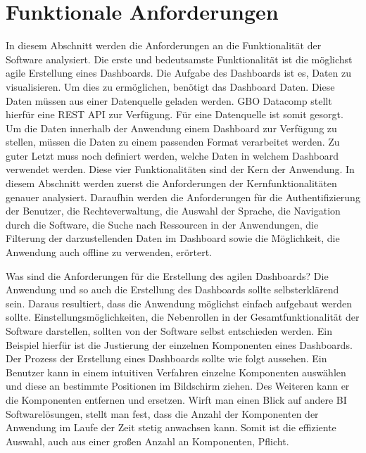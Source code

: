 \section{Funktionale Anforderungen}
\label{sec:funktionaleanforderungen}
In diesem Abschnitt werden die Anforderungen an die Funktionalität der Software analysiert.
Die erste und bedeutsamste Funktionalität ist
die möglichst agile Erstellung eines Dashboards. Die Aufgabe des Dashboards ist es, Daten
zu visualisieren. Um dies zu ermöglichen, benötigt das Dashboard Daten. Diese Daten
müssen aus einer Datenquelle geladen werden. GBO Datacomp stellt hierfür eine REST API
zur Verfügung. Für eine Datenquelle ist somit gesorgt. Um die Daten innerhalb der Anwendung
einem Dashboard zur Verfügung zu stellen, müssen die Daten zu einem passenden Format verarbeitet werden.
Zu guter Letzt muss noch definiert werden, welche Daten in welchem Dashboard verwendet
werden. Diese vier Funktionalitäten sind der Kern der Anwendung. In diesem Abschnitt
werden zuerst die Anforderungen der Kernfunktionalitäten genauer analysiert. Daraufhin werden die Anforderungen
für die Authentifizierung der Benutzer, die Rechteverwaltung, die Auswahl der Sprache,
die Navigation durch die Software, die Suche nach Ressourcen in der Anwendungen,
die Filterung der darzustellenden Daten im Dashboard sowie die Möglichkeit,
die Anwendung auch offline zu verwenden, erörtert.

Was sind die Anforderungen für die Erstellung des agilen Dashboards? Die Anwendung und
so auch die Erstellung des Dashboards sollte selbsterklärend sein. Daraus resultiert, 
dass die Anwendung möglichst einfach aufgebaut werden sollte. Einstellungsmöglichkeiten,
die Nebenrollen in der Gesamtfunktionalität der Software darstellen, sollten von der
Software selbst entschieden werden. Ein Beispiel hierfür ist die Justierung der
einzelnen Komponenten eines Dashboards. Der Prozess der Erstellung eines Dashboards
sollte wie folgt aussehen. Ein Benutzer kann in einem intuitiven Verfahren
einzelne Komponenten auswählen und diese an bestimmte Positionen im Bildschirm
ziehen. Des Weiteren kann er die Komponenten
entfernen und ersetzen. Wirft man einen Blick auf andere BI Softwarelösungen,
stellt man fest, dass die Anzahl der Komponenten der Anwendung im Laufe der Zeit
stetig anwachsen kann. Somit ist die effiziente Auswahl, auch aus einer großen
Anzahl an Komponenten, Pflicht.

